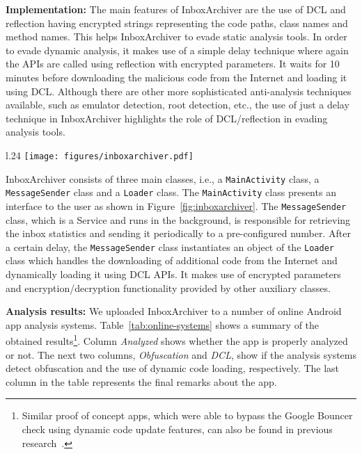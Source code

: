 \textbf{Implementation:} The main features of InboxArchiver are the use of DCL and reflection having encrypted strings representing the code paths, class names and method names. This helps InboxArchiver to evade static analysis tools. In order to evade dynamic analysis, it makes use of a simple delay technique where again the APIs are called using reflection with encrypted parameters. It waits for 10 minutes before downloading the malicious code from the Internet and loading it using DCL. Although there are other more sophisticated anti-analysis techniques available, such as emulator detection, root detection, etc., the use of just a delay technique in InboxArchiver highlights the role of DCL/reflection in evading analysis tools.

\begin{wrapfigure}{l}{.24\textwidth}
\texttt{[image: figures/inboxarchiver.pdf]}
\caption{InboxArchiver}
\label{fig:inboxarchiver}
\end{wrapfigure}




 


InboxArchiver consists of three main classes, i.e., a \texttt{MainActivity} class, a \texttt{MessageSender} class and a \texttt{Loader} class. The \texttt{MainActivity} class presents an interface to the user as shown in Figure~\ref{fig:inboxarchiver}. The \texttt{MessageSender} class, which is a Service and runs in the background, is responsible for retrieving the inbox statistics and sending it periodically to a pre-configured number. After a certain delay, the \texttt{MessageSender} class instantiates an object of the \texttt{Loader} class which handles the downloading of additional code from the Internet and dynamically loading it using DCL APIs. It makes use of encrypted parameters and encryption/decryption functionality provided by other auxiliary classes. 

\textbf{Analysis results:} We uploaded InboxArchiver to a number of online Android app analysis systems. Table~\ref{tab:online-systems} shows a summary of the obtained results\footnote{Similar proof of concept apps, which were able to bypass the Google Bouncer check using dynamic code update features, can also be found in previous research~\cite{ExecuteThis_Poeplau2014,canfora2015composition}.}. Column \textit{Analyzed} shows whether the app is properly analyzed or not. The next two columns, \textit{Obfuscation} and \textit{DCL}, show if the analysis systems detect obfuscation and the use of dynamic code loading, respectively. The last column in the table represents the final remarks about the app. 

